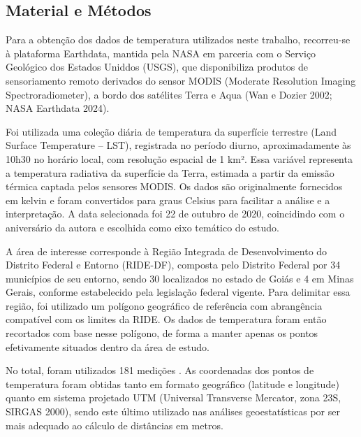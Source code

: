 \documentclass[
  letterpaper,
  DIV=11,
  numbers=noendperiod]{scrartcl}
\begin{document}
\subsection{Material e Métodos}\label{sec-data-methods}

Para a obtenção dos dados de temperatura utilizados neste trabalho,
recorreu-se à plataforma Earthdata, mantida pela NASA em parceria com o
Serviço Geológico dos Estados Uniddos (USGS), que disponibiliza produtos
de sensoriamento remoto derivados do sensor MODIS (Moderate Resolution
Imaging Spectroradiometer), a bordo dos satélites Terra e Aqua (Wan e
Dozier 2002; NASA Earthdata 2024).

Foi utilizada uma coleção diária de temperatura da superfície terrestre
(Land Surface Temperature -- LST), registrada no período diurno,
aproximadamente às 10h30 no horário local, com resolução espacial de 1
km². Essa variável representa a temperatura radiativa da superfície da
Terra, estimada a partir da emissão térmica captada pelos sensores
MODIS. Os dados são originalmente fornecidos em kelvin e foram
convertidos para graus Celsius para facilitar a análise e a
interpretação. A data selecionada foi 22 de outubro de 2020, coincidindo
com o aniversário da autora e escolhida como eixo temático do estudo.

A área de interesse corresponde à Região Integrada de Desenvolvimento do
Distrito Federal e Entorno (RIDE-DF), composta pelo Distrito Federal por
34 municípios de seu entorno, sendo 30 localizados no estado de Goiás e
4 em Minas Gerais, conforme estabelecido pela legislação federal
vigente. Para delimitar essa região, foi utilizado um polígono
geográfico de referência com abrangência compatível com os limites da
RIDE. Os dados de temperatura foram então recortados com base nesse
polígono, de forma a manter apenas os pontos efetivamente situados
dentro da área de estudo.

No total, foram utilizados 181 medições . As coordenadas dos pontos de
temperatura foram obtidas tanto em formato geográfico (latitude e
longitude) quanto em sistema projetado UTM (Universal Transverse
Mercator, zona 23S, SIRGAS 2000), sendo este último utilizado nas
análises geoestatísticas por ser mais adequado ao cálculo de distâncias
em metros.
\end{document}
